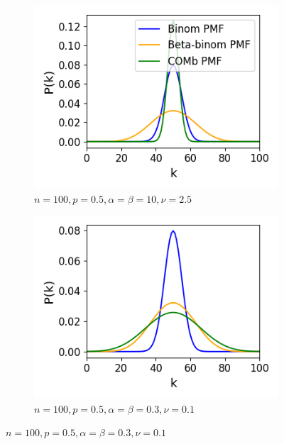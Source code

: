 \documentclass[a4paper,12pt]{article}
\theoremstyle{definition}
\begin{document}
      \newpage

      \begin{figure}[h]
        \begin{subfigure}[h]{0.5\linewidth}
          \includegraphics[width=\textwidth]{figures/comb_underdispersion.png}
          \caption{$n=100, p=0.5, \alpha=\beta=10, \nu=2.5$}
          \label{fig:comb_underdispersion}
        \end{subfigure}
        \begin{subfigure}[h]{0.5\linewidth}
          \includegraphics[width=\textwidth]{figures/comb_overrdispersion.png}
          \caption{$n=100, p=0.5, \alpha=\beta=0.3, \nu=0.1$}
          \label{fig:comb_overrdispersion}
        \end{subfigure}

\end{figure}
\end{document}
